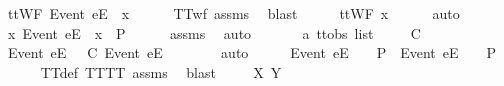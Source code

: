 \begin{isabellebody}
\ {\isachardoublequoteopen}ttWF\ {\isacharparenleft}{\isacharbrackleft}Event\ e{\isacharbrackright}\isactrlsub E\ {\isacharhash}\ x{\isacharparenright}{\isachardoublequoteclose}\isanewline
\ \ \ \ \isamarkupfalse%
\ TT{\isacharunderscore}wf\ assms{\isacharparenleft}{}{\isacharparenright}\ \isamarkupfalse%
\ blast\isanewline
\ \ \isamarkupfalse%
\ \isamarkupfalse%
\ {\isachardoublequoteopen}ttWF\ x{\isachardoublequoteclose}\isanewline
\ \ \ \ \isamarkupfalse%
\ auto\isanewline
{}\isamarkupfalse%
\isanewline
\ \ \isamarkupfalse%
\ {\isachardoublequoteopen}{\isasymexists}x{\isachardot}\ {\isacharbrackleft}Event\ e{\isacharbrackright}\isactrlsub E\ {\isacharhash}\ x\ {\isasymin}\ P{\isachardoublequoteclose}\isanewline
\ \ \ \ \isamarkupfalse%
\ assms{\isacharparenleft}{}{\isacharparenright}\ \isamarkupfalse%
\ auto\isanewline
{}\isamarkupfalse%
\isanewline
\ \ \isamarkupfalse%
\ {\isasymrho}\ {\isasymsigma}\ {\isacharcolon}{\isacharcolon}\ {\isachardoublequoteopen}{\isacharprime}a\ ttobs\ list{\isachardoublequoteclose}\isanewline
\ \ \isamarkupfalse%
\ {\isachardoublequoteopen}{\isasymrho}\ {\isasymlesssim}\isactrlsub C\ {\isasymsigma}{\isachardoublequoteclose}\isanewline
\ \ \isamarkupfalse%
\ \isamarkupfalse%
\ {\isachardoublequoteopen}{\isacharbrackleft}Event\ e{\isacharbrackright}\isactrlsub E\ {\isacharhash}\ {\isasymrho}\ {\isasymlesssim}\isactrlsub C\ {\isacharbrackleft}Event\ e{\isacharbrackright}\isactrlsub E\ {\isacharhash}\ {\isasymsigma}{\isachardoublequoteclose}\isanewline
\ \ \ \ \isamarkupfalse%
\ auto\isanewline
\ \ \isamarkupfalse%
\ \isamarkupfalse%
\ {\isachardoublequoteopen}{\isacharbrackleft}Event\ e{\isacharbrackright}\isactrlsub E\ {\isacharhash}\ {\isasymsigma}\ {\isasymin}\ P\ {\isasymLongrightarrow}\ {\isacharbrackleft}Event\ e{\isacharbrackright}\isactrlsub E\ {\isacharhash}\ {\isasymrho}\ {\isasymin}\ P{\isachardoublequoteclose}\isanewline
\ \ \ \ \isamarkupfalse%
\ TT{}{\isacharunderscore}def\ TT{\isacharunderscore}TT{}\ assms{\isacharparenleft}{}{\isacharparenright}\ \isamarkupfalse%
\ blast\isanewline
{}\isamarkupfalse%
\isanewline
\ \ \isamarkupfalse%
\ {\isasymrho}\ X\ Y\isanewline
\ \ \isamarkupfalse%

\end{isabellebody}
